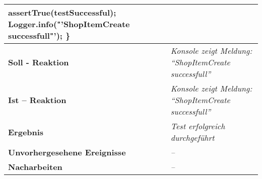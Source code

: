 \begin{longtable}{|p{4cm}|p{11cm}|}
{\hspace*{1mm}assertTrue(testSuccessful);\newline
\hspace*{1mm}Logger.info("'ShopItemCreate successfull"');\newline
\}
} \\
\hline
\textbf{Soll - Reaktion} & \textit{Konsole zeigt Meldung: "`ShopItemCreate successfull"'
} \\
\hline
\textbf{Ist -- Reaktion} & \textit{Konsole zeigt Meldung: "`ShopItemCreate successfull"'} \\
\hline
\textbf{Ergebnis} & \textit{Test erfolgreich durchgeführt} \\
\hline
\textbf{Unvorhergesehene Ereignisse} &
\textit{--} \\
\hline
\textbf{Nacharbeiten } & \textit{--} \\
\hline
\end{longtable}

